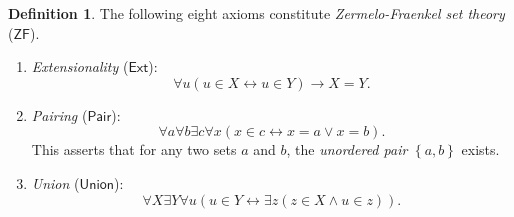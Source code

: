 \documentclass[10pt,letterpaper,cm]{nupset}
\theoremstyle{definition}
\newtheorem{definition}{Definition}[subsection]
\theoremstyle{theorem}
\theoremstyle{remark}
\newcommand{\1}{\mathbf{1}}
\newcommand{\0}{\vec 0}
\newcommand{\zf}{\mathsf{ZF}}
\begin{document}
\pagebreak

\begin{definition}
 The following eight axioms constitute \textit{Zermelo-Fraenkel set theory} ($\zf$). 
\begin{enumerate}
\item \textit{Extensionality} ($\mathsf{Ext}$):
\[
\forall u(u \in X \leftrightarrow u \in Y) \rightarrow X=Y.
\]
\item \textit{Pairing} ($\mathsf{Pair}$):
\[
\forall a \forall b \exists c \forall x(x \in c \leftrightarrow x=a \vee x=b).
\]
This asserts that for any two sets $a$ and $b$, the \textit{unordered pair} $\left\{a,b\right\}$ exists. 
\item \textit{Union} ($\mathsf{Union}$):
\[
\forall X \exists Y \forall u(u \in Y \leftrightarrow \exists z(z \in X \wedge u \in z)).
\]


\end{enumerate}
\end{definition}
\end{document}

